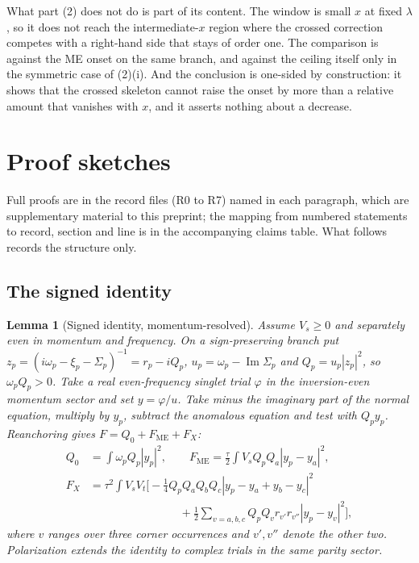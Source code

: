 \documentclass[11pt]{article}
\newcommand{\Rg}{\mathrm{ME}}
\newtheorem{lemma}[theorem]{Lemma}
\theoremstyle{definition}
\theoremstyle{remark}
\begin{document}
What part (2) does not do is part of its content. The window is small $x$ at fixed $\lambda$, so it does not reach the intermediate-$x$ region where the crossed correction competes with a right-hand side that stays of order one. The comparison is against the ME onset on the same branch, and against the ceiling itself only in the symmetric case of (2)(i). And the conclusion is one-sided by construction: it shows that the crossed skeleton cannot raise the onset by more than a relative amount that vanishes with $x$, and it asserts nothing about a decrease.

\section{Proof sketches}\label{sec:proofs}

Full proofs are in the record files (R0 to R7) named in each paragraph, which are supplementary material to this preprint; the mapping from numbered statements to record, section and line is in the accompanying claims table. What follows records the structure only.

\subsection{The signed identity}

\begin{lemma}[Signed identity, momentum-resolved]\label{lem:signed}
Assume $V_s\ge0$ and separately even in momentum and frequency. On a sign-preserving branch put $z_p=(i\omega_p-\xi_p-\Sigma_p)^{-1}=r_p-iQ_p$, $u_p=\omega_p-\operatorname{Im}\Sigma_p$ and $Q_p=u_p|z_p|^2$, so $\omega_p Q_p>0$. Take a real even-frequency singlet trial $\varphi$ in the inversion-even momentum sector and set $y=\varphi/u$. Take minus the imaginary part of the normal equation, multiply by $y_p$, subtract the anomalous equation and test with $Q_p y_p$. Reanchoring gives $F=Q_0+F_{\Rg}+F_X$:
\begin{align}
Q_0&=\int\omega_p Q_p|y_p|^2,\qquad F_{\Rg}=\frac\tau2\int V_s Q_pQ_a|y_p-y_a|^2,\\
F_X&=\tau^2\!\int V_s V_t\Big[-\tfrac14 Q_pQ_aQ_bQ_c|y_p-y_a+y_b-y_c|^2\nonumber\\
&\hspace{8em}+\tfrac12\sum_{v=a,b,c}Q_pQ_v r_{v'}r_{v''}|y_p-y_v|^2\Big],
\end{align}
where $v$ ranges over three corner occurrences and $v',v''$ denote the other two. Polarization extends the identity to complex trials in the same parity sector.
\end{lemma}
\end{document}
